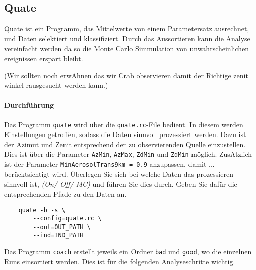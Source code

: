 \subsection{Quate}%
\label{sub:quate}

Quate ist ein Programm,
das Mittelwerte von einem Parametersatz ausrechnet,
und Daten selektiert und klassifiziert.
Durch das Aussortieren kann die Analyse vereinfacht werden da so die Monte Carlo
Simmulation von unwahrscheinlichen ereignissen erspart bleibt. 

(Wir sollten noch erwAhnen das wir Crab observieren damit der Richtige zenit
winkel rausgesucht werden kann.)

\paragraph{Durchführung}%
Das Programm \texttt{quate} wird über die 
\texttt{quate.rc}-File bedient.
In diesem werden Einstellungen getroffen, 
sodass die Daten sinnvoll prozessiert werden.
Dazu ist der Azimut und Zenit entsprechend der zu 
observierenden Quelle einzustellen. 
Dies ist über die Parameter \texttt{AzMin},
\texttt{AzMax}, \texttt{ZdMin} und \texttt{ZdMin}
möglich.
ZusAtzlich ist der Parameter 
\texttt{MinAerosolTrans9km = 0.9} anzupassen, 
damit ... berücktsichtigt wird.
Überlegen Sie sich bei welche Daten das prozessieren sinnvoll ist, 
\textit{(On/ Off/ MC)} und führen Sie dies durch.
Geben Sie dafür die entsprechenden Pfade zu den Daten an.
\begin{lstlisting}
	quate -b -s \
		--config=quate.rc \
		--out=OUT_PATH \ 
		--ind=IND_PATH 
\end{lstlisting}
Das Programm \texttt{coach} erstellt jeweils ein Ordner 
\texttt{bad} und \texttt{good},
wo die einzelnen Runs einsortiert werden. 
Dies ist für die folgenden Analyseschritte wichtig.
